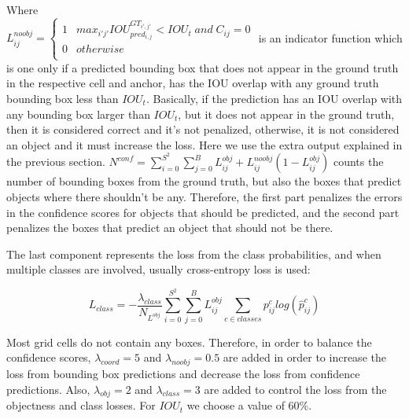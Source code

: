     Where \\ $
    L_{ij}^{noobj} = \left\{
        \begin{array}{ll}
              1 & max_{i'j'} IOU_{pred_{i,j}}^{GT_{i',j'}} < IOU_{t} \; and \; C_{ij} = 0\\
              0 & otherwise\\
        \end{array} 
        \right.
        $ is an indicator function which is one only if a predicted bounding box that does not appear in the ground truth in the respective cell and anchor, has the IOU overlap with any ground truth bounding box less than $IOU_{t}$. Basically, if the prediction has an IOU overlap with any bounding box larger than $IOU_{t}$, but it does not appear in the ground truth, then it is considered correct and it's not penalized, otherwise, it is not considered an object and it must increase the loss. Here we use the extra output explained in the previous section. $N^{conf} = \sum_{i=0}^{S^2}\sum_{j=0}^B L_{ij}^{obj} + L_{ij}^{noobj}(1-L_{ij}^{obj})$ counts the number of bounding boxes from the ground truth, but also the boxes that predict objects where there shouldn't be any. Therefore, the first part penalizes the errors in the confidence scores for objects that should be predicted, and the second part penalizes the boxes that predict an object that should not be there.
        
        
    
        
    The last component represents the loss from the class probabilities, and when multiple classes are involved, usually cross-entropy loss is used:
    
    \begin{equation*}
        L_{class} = - \frac{\lambda_{class}}{N_{L^{obj}}} 
        \sum_{i=0}^{S^2} \sum_{j=0}^B
        L_{ij}^{obj}
        \sum_{c \in classes}p_{ij}^c log(\hat{p}_{ij}^c)
        \label{class_loss}
    \end{equation*}
    
    
    
    Most grid cells do not contain any boxes. Therefore, in order to balance the confidence scores, $\lambda_{coord}=5$ and $\lambda_{noobj}=0.5$ are added in order to increase the loss from bounding box predictions and decrease the loss from confidence predictions. Also, $\lambda_{obj}=2$ and $\lambda_{class}=3$ are added to control the loss from the objectness and class losses. For $IOU_t$ we choose a value of 60\%.%
    

